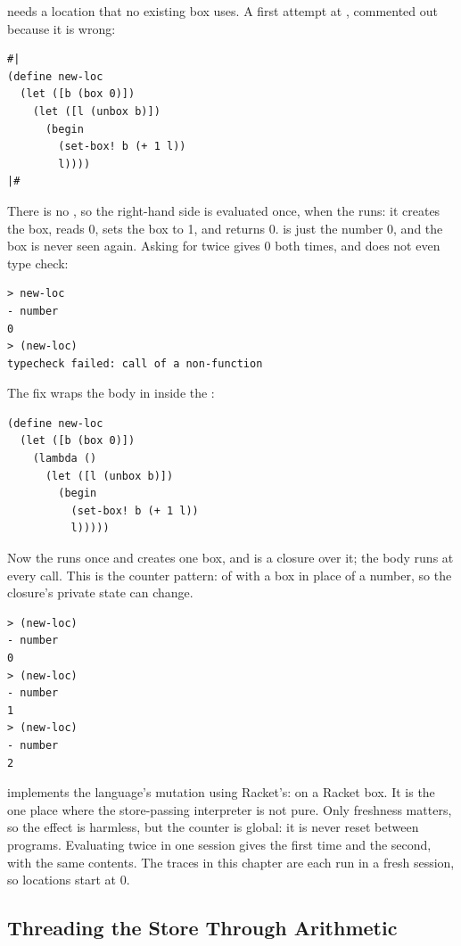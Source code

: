  needs a location that no existing box uses. A first attempt at , commented out because it is wrong:
\begin{lstlisting}
#|
(define new-loc
  (let ([b (box 0)])
    (let ([l (unbox b)])
      (begin
        (set-box! b (+ 1 l))
        l))))
|#
\end{lstlisting}
There is no , so the right-hand side is evaluated once, when the  runs: it creates the box, reads 0, sets the box to 1, and returns 0.  is just the number 0, and the box is never seen again. Asking for  twice gives 0 both times, and  does not even type check:
\begin{lstlisting}[style=repl]
> new-loc
- number
0
> (new-loc)
typecheck failed: call of a non-function
\end{lstlisting}
The fix wraps the body in  inside the :
\begin{lstlisting}
(define new-loc
  (let ([b (box 0)])
    (lambda ()
      (let ([l (unbox b)])
        (begin
          (set-box! b (+ 1 l))
          l)))))
\end{lstlisting}
Now the  runs once and creates one box, and  is a closure over it; the body runs at every call. This is the counter pattern:  of  with a box in place of a number, so the closure's private state can change.
\begin{lstlisting}[style=repl]
> (new-loc)
- number
0
> (new-loc)
- number
1
> (new-loc)
- number
2
\end{lstlisting}

\begin{remark}
 implements the language's mutation using Racket's:  on a Racket box. It is the one place where the store-passing interpreter is not pure. Only freshness matters, so the effect is harmless, but the counter is global: it is never reset between programs. Evaluating  twice in one session gives  the first time and  the second, with the same contents. The traces in this chapter are each run in a fresh session, so locations start at 0.
\end{remark}

\subsection{Threading the Store Through Arithmetic}

